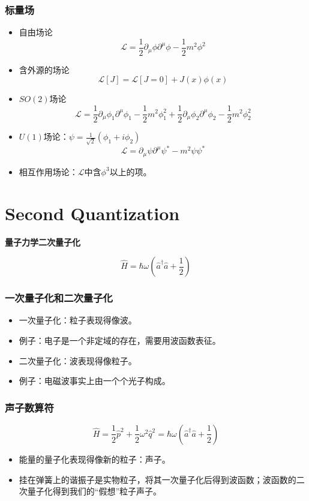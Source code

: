 \documentclass[aspectratio=1610,14pt,mathserif]{beamer}
\newcommand{\bch}{}
\newcommand{\ech}{}
\def\bcenter{\begin{center}}
\def\ecenter{\end{center}}
\def\skipline{{\vskip0.1in}}
\def\tbox#1{\begin{tcolorbox}#1\end{tcolorbox}}
\newcommand{\lag}{\mathcal{L}}
\def\secpage#1#2{\begin{frame}\bch\bcenter{\bf \Huge #1} \skipline \tbox{#2}\ecenter\ech\end{frame}}
\newcommand{\blue}[1]{{\color{blue} #1}}
\begin{document}
\begin{frame}
\frametitle{\bch 标量场 \ech}
\bch
\begin{itemize}
\item 自由场论
$$
\lag = \frac{1}{2} \partial_\mu \phi \partial^\mu \phi - \frac{1}{2}m^2 \phi^2
$$
\item 含外源的场论
$$
\lag[J] = \lag[J=0] + J(x) \phi(x)
$$
\item $SO(2)$场论
$$
\lag = \frac{1}{2} \partial_\mu \phi_1 \partial^\mu \phi_1 - \frac{1}{2}m^2 \phi_1^2 +  \frac{1}{2} \partial_\mu \phi_2\partial^\mu \phi_2 - \frac{1}{2}m^2 \phi_2^2
$$
\item $U(1)$场论：$\psi = \frac{1}{\sqrt 2} (\phi_1 + i \phi_2)$
$$
\lag = \partial_\mu \psi \partial^\mu \psi^* - m^2 \psi \psi^*
$$
\item 相互作用场论：$\lag$中含$\phi^3$以上的项。
\end{itemize}
\ech
\end{frame}

\section{Second Quantization}
\secpage{量子力学二次量子化}{$$\hat H = \hbar \omega (\hat{a}^\dagger \hat{a} + \frac{1}{2})$$}

\begin{frame}
\frametitle{\bch 一次量子化和二次量子化 \ech}
\bch
\begin{itemize}
\item \blue{一次量子化：粒子表现得像波。}
\item 例子：电子是一个非定域的存在，需要用波函数表征。
\item \blue{二次量子化：波表现得像粒子。}
\item 例子：电磁波事实上由一个个光子构成。
\end{itemize}
\ech
\end{frame}


\begin{frame}
\frametitle{\bch 声子数算符 \ech}
\bch
$$ \hat H = \frac{1}{2}\hat p^2 + \frac{1}{2}\omega^2 \hat q^2 = \hbar \omega (\hat a^\dagger \hat a + \frac{1}{2} )$$
\begin{itemize}
\item 能量的量子化表现得像新的粒子：声子。
\item 挂在弹簧上的谐振子是实物粒子，将其一次量子化后得到波函数；波函数的二次量子化得到我们的“假想”粒子声子。
\end{itemize}
\ech
\end{frame}
\end{document}
